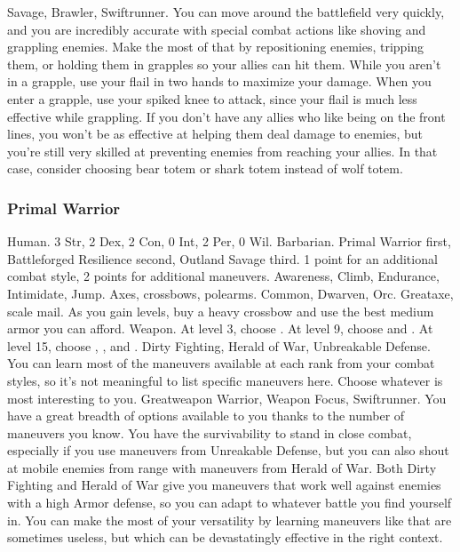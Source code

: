              Savage, Brawler, Swiftrunner.
             You can move around the battlefield very quickly, and you are incredibly accurate with special combat actions like shoving and grappling enemies.
            Make the most of that by repositioning enemies, tripping them, or holding them in grapples so your allies can hit them.
            While you aren't in a grapple, use your flail in two hands to maximize your damage.
            When you enter a grapple, use your spiked knee to attack, since your flail is much less effective while grappling.
            If you don't have any allies who like being on the front lines, you won't be as effective at helping them deal damage to enemies, but you're still very skilled at preventing enemies from reaching your allies.
            In that case, consider choosing bear totem or shark totem instead of wolf totem.

        \subsubsection{Primal Warrior}
             Human.
             3 Str, 2 Dex, 2 Con, 0 Int, 2 Per, 0 Wil.
             Barbarian.
             Primal Warrior first, Battleforged Resilience second, Outland Savage third.
             1 point for an additional combat style, 2 points for additional maneuvers.
             Awareness, Climb, Endurance, Intimidate, Jump.
             Axes, crossbows, polearms.
             Common, Dwarven, Orc.
             Greataxe, scale mail. As you gain levels, buy a heavy crossbow and use the best medium armor you can afford.
             Weapon.
                At level 3, choose .
                At level 9, choose  and .
                At level 15, choose , , and .
             Dirty Fighting, Herald of War, Unbreakable Defense.
             You can learn most of the maneuvers available at each rank from your combat styles, so it's not meaningful to list specific maneuvers here.
            Choose whatever is most interesting to you.
             Greatweapon Warrior, Weapon Focus, Swiftrunner.
             You have a great breadth of options available to you thanks to the number of maneuvers you know.
            You have the survivability to stand in close combat, especially if you use maneuvers from Unreakable Defense, but you can also shout at mobile enemies from range with maneuvers from Herald of War.
            Both Dirty Fighting and Herald of War give you maneuvers that work well against enemies with a high Armor defense, so you can adapt to whatever battle you find yourself in.
            You can make the most of your versatility by learning maneuvers like  that are sometimes useless, but which can be devastatingly effective in the right context.

